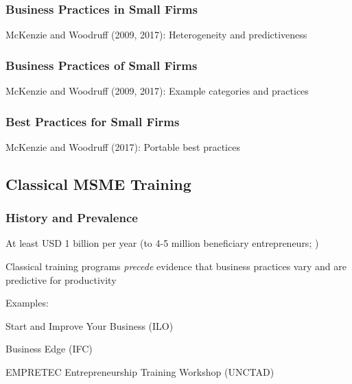 \documentclass[hideothersubsections, usenames,dvipsnames,10pt]{beamer}
\newenvironment{itemize_3pt}{\itemize\addtolength{\itemsep}{3pt}}{\enditemize}
\begin{document}

\begin{frame}
\frametitle{Business Practices in Small Firms}
	\begin{itemize_3pt}
	\item McKenzie and Woodruff (2009, 2017): Heterogeneity and predictiveness \citep{McKenzie2009, McKenzie2017}
	\vspace{0.1in}
	\end{itemize_3pt}
\end{frame}

\begin{frame}
\frametitle{Business Practices of Small Firms}
	\begin{itemize_3pt}
	\item McKenzie and Woodruff (2009, 2017): Example categories and practices \citep{McKenzie2009, McKenzie2017}
	\vspace{0.1in}
	\end{itemize_3pt}
\end{frame}


\begin{frame}
\frametitle{Best Practices for Small Firms}
	\begin{itemize_3pt}
	\item McKenzie and Woodruff (2017): Portable best practices \citep{McKenzie2017}
	\vspace{0.1in}
	\end{itemize_3pt}
\end{frame}


\subsection{Classical MSME Training}


\begin{frame}
\frametitle{History and Prevalence}
	\begin{itemize_3pt}
		\item At least \textcolor{bdf}{USD 1 billion per year} (to 4-5 million beneficiary entrepreneurs; \citet{McKenzie2020})
		\item Classical training programs \emph{precede} evidence that business practices vary and are predictive for productivity
		\vspace{0.1in}
		\item Examples:
		\begin{itemize_3pt}
			\item Start and Improve Your Business (ILO)
			\item Business Edge (IFC)
			\item EMPRETEC Entrepreneurship Training Workshop (UNCTAD)
		\end{itemize_3pt} 
	\end{itemize_3pt}
\end{frame}
\end{document}

